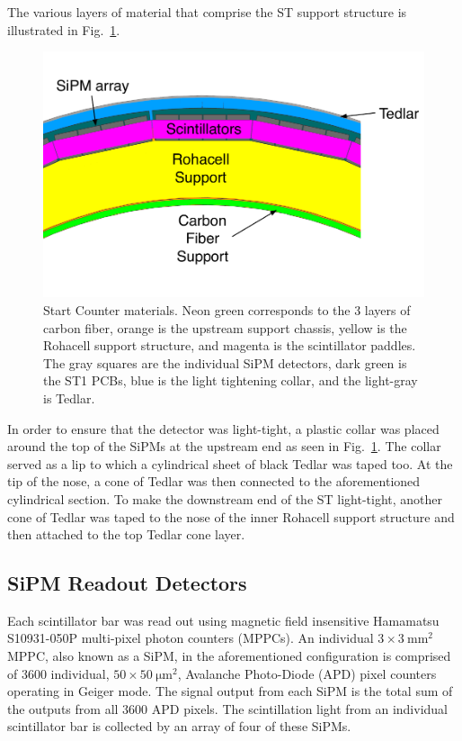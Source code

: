 The various layers of material that comprise the ST support structure is illustrated in Fig.~\ref{fig:stmaterials}.
	\begin{figure}[!htb]
		\centering
		\includegraphics[width=1.0\columnwidth]{design/figs/st_materials}
		\caption{Start Counter materials.  Neon green corresponds to the 3 layers of carbon fiber, orange is the upstream support chassis, yellow is the Rohacell support structure, and magenta is the scintillator paddles.  The gray squares are the individual SiPM detectors, dark green is the ST1 PCBs, blue is the light tightening collar, and the light-gray is Tedlar.}
		\label{fig:stmaterials}
	\end{figure}
In order to ensure that the detector was light-tight, a plastic collar was placed around the top of the SiPMs at the upstream end as seen in Fig.~\ref{fig:stmaterials}.  The collar served as a lip to which a cylindrical sheet of black Tedlar was taped too.  At the tip of the nose, a cone of Tedlar was then connected to the aforementioned cylindrical section.  To make the downstream end of the ST light-tight, another cone of Tedlar was taped to the nose of the inner Rohacell support structure and then attached to the top Tedlar cone layer. 


\subsection{SiPM Readout Detectors} \label{sec:design_sipms}

Each scintillator bar was read out using magnetic field insensitive Hamamatsu S10931-050P multi-pixel photon counters (MPPCs)\cite{hamamatsu}.  An individual $\mathrm{3 \times 3\ mm^2}$ MPPC, also known as a SiPM, in the aforementioned configuration is comprised of 3600 individual, $\mathrm{50 \times 50\ \mu m^2}$, Avalanche Photo-Diode (APD) pixel counters operating in Geiger mode. The signal output from each SiPM is the total sum of the outputs from all 3600 APD pixels\cite{sipm_spec}.  The scintillation light from an individual scintillator bar is collected by an array of four of these SiPMs.

